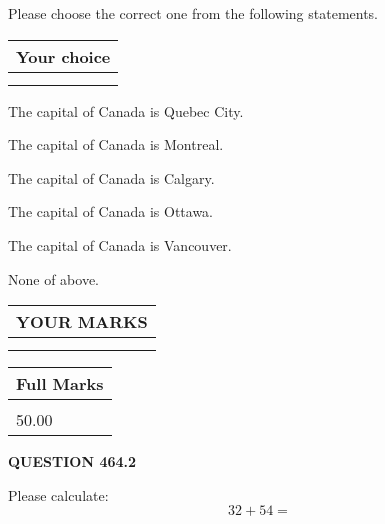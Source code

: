 \documentclass[12pt]{article}
\begin{document}
  
Please choose the correct one from the following statements.
  
  
\noindent\hspace{3.0in} \begin{tabular}{|l|}
\hline
Your choice \\
\hline
 \\ 
 \\ 
\hline
\end{tabular}
  
  
 
 
The capital of Canada is Quebec City.
 
 
The capital of Canada is Montreal.
 
 
The capital of Canada is Calgary.
 
 
The capital of Canada is Ottawa.
 
 
The capital of Canada is Vancouver.
 
 
 None of above.
 
 
  
\vspace{0.2in}
  
\noindent\begin{tabular}{|l|}
\hline
 YOUR MARKS  \\
\hline
 \\ 
 \\ 
\hline
\end{tabular}
\hspace{0.05in} \begin{tabular}{|l|}
\hline
 Full Marks  \\
\hline
 \\ 
50.00 \\
\hline
\end{tabular}
{\textbf{\Large{QUESTION
464.2 
}}}
  
  
 
Please calculate:
\begin{equation}
32 +  %
54 = \nonumber
\end{equation}
 

 

 
   
   
 \vspace{0.2in}
 
   
   
   
   
\end{document}

